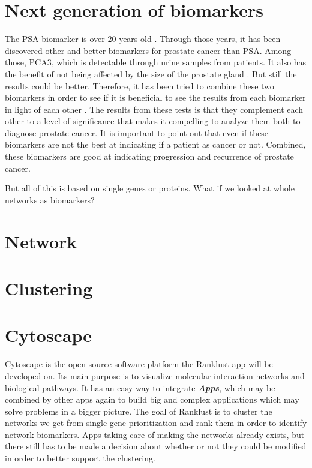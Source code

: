 \documentclass[UKenglish,11pt,a4paper]{article}
\begin{document}
\section{Next generation of biomarkers}
The PSA biomarker is over 20 years old \cite{psa-age}. Through those years, it has been discovered other and better
biomarkers for prostate cancer than PSA. Among those, PCA3, which is detectable through urine samples from patients. It
also has the benefit of not being affected by the size of the prostate gland \cite{pca3-size}. But still the results
could be better. Therefore, it has been tried to combine these two biomarkers in order to see if it is beneficial to
see the results from each biomarker in light of each other \cite{beyondpsa}. The results from these tests is that they
complement each other to a level of significance that makes it compelling to analyze them both to diagnose prostate
cancer. It is important to point out that even if these biomarkers are not the best at indicating if a patient as cancer
or not. Combined, these biomarkers are good at indicating progression and recurrence of prostate cancer.

But all of this is based on single genes or proteins. What if we looked at whole networks as biomarkers?
\section{Network}
\section{Clustering}
\section{Cytoscape}
Cytoscape is the open-source software platform the Ranklust app will be developed on. Its main purpose is to visualize
molecular interaction networks and biological pathways. It has an easy way to integrate \textbf{\textit{Apps}}, which may
be combined by other apps again to build big and complex applications which may solve problems in a bigger picture. The
goal of Ranklust is to cluster the networks we get from single gene prioritization and rank them in order to identify
network biomarkers. Apps taking care of making the networks already exists, but there still has to be made a decision
about whether or not they could be modified in order to better support the clustering.
\end{document}
